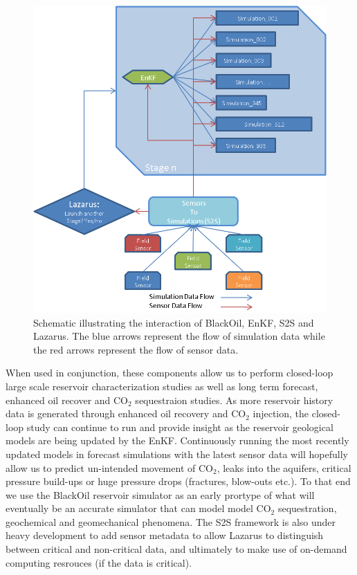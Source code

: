 \documentclass[conference,final]{IEEEtran}
\begin{document}
\begin{figure}
\begin{center}
\includegraphics*[scale=0.7,angle=0]{figures/Picture2.png}
\end{center}
\caption{Schematic illustrating the interaction of BlackOil, EnKF, S2S and Lazarus. The blue arrows represent the flow of 
simulation data while the red arrows represent the flow of sensor data.}
\label{fig:irregular_execution}
\end{figure}


When used in conjunction, these components allow us to perform closed-loop large scale reservoir characterization studies as well 
as long term forecast, enhanced oil recover and CO$_2$ sequestraion studies. As more reservoir history data is generated through 
enhanced oil recovery and CO$_2$ injection, the closed-loop study can continue to run and provide insight as the reservoir
geological models are being updated by the EnKF. Continuously running the most recently updated models in forecast simulations 
with the latest sensor data will hopefully allow us to predict un-intended movement of CO$_2$, leaks into the aquifers, critical 
pressure build-ups or huge pressure drops (fractures, blow-outs etc.). To that end we use the BlackOil reservoir simulator as an 
early prortype of what will eventually be an accurate simulator that can model model CO$_2$ sequestration, geochemical and 
geomechanical phenomena. The S2S framework is also under heavy development to add sensor metadata to allow Lazarus to distinguish 
between critical and non-critical data, and ultimately to make use of on-demand computing resrouces (if the data is critical). 
\end{document}
